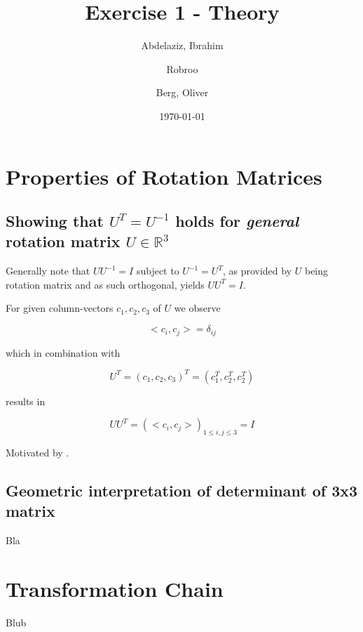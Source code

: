 \documentclass[a4paper, twoside, english]{article}
\title{Exercise 1 - Theory}
\author{
	Abdelaziz, Ibrahim
	\and
	Robroo
	\and
	Berg, Oliver
}
\date{\today}
\begin{document}
\maketitle

\section{Properties of Rotation Matrices}

\subsection{Showing that $U^T = U^{-1}$ holds for \textit{general} rotation matrix $U \in \mathbb{R}^3$}

Generally note that $UU^{-1}=I$ subject to $U^{-1} = U^T$, as provided by $U$ being rotation matrix and as such orthogonal, yields $UU^T = I$.

For given column-vectors $c_1, c_2, c_3$ of $U$ we observe 

\begin{equation*}
	<c_i, c_j> = \delta_{i j}
\end{equation*}

which in combination with

\begin{equation*}
	U^T = (c_1, c_2, c_3)^T = (c_1^T, c_2^T, c_2^T)
\end{equation*}

results in

\begin{equation*}
	UU^T = (<c_i, c_j>)_{1 \le i, j \le 3} = I
\end{equation*}

Motivated by \cite{MathematicsSEMatrixTransposeIdentity}\cite{MathematicsSEMatrixTransposeIdentity2}\cite{WikiOrthogonaleMatrix}.


\subsection{Geometric interpretation of determinant of 3x3 matrix}

Bla

\section{Transformation Chain}

Blub



\end{document}
